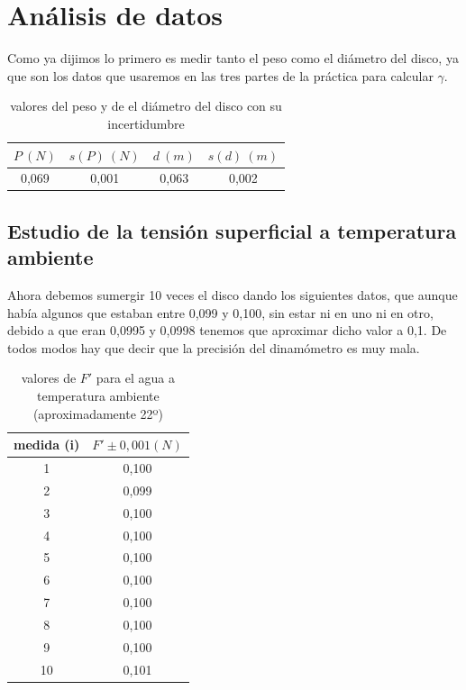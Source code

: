 \documentclass[12pt,a4paper]{book}
\begin{document}
\section{Análisis de datos}
Como ya dijimos lo primero es medir tanto el peso como el diámetro del disco, ya que son los datos que usaremos en las tres partes de la práctica para calcular $\gamma$.

\begin{table}[h!] %
\begin{center}
\begin{tabular}{|c|c|c|c|} \hline
$P  \ (N)$ & $s(P) \ (N)$ & $d \ (m)$ & $s(d) \ (m)$
 \\ \hline
0,069  & 0,001 & 0,063  & 0,002
 \\  \hline
\end{tabular}
\caption{valores del peso y de el diámetro del disco con su incertidumbre}
\label{tab:masa y peso}
\end{center}
\end{table}

\subsection{Estudio de la tensión superficial a temperatura ambiente}

Ahora debemos sumergir 10 veces el disco dando los siguientes datos, que aunque había algunos que estaban entre 0,099 y 0,100, sin estar ni en uno ni en otro, debido a que eran 0,0995 y 0,0998 tenemos que aproximar dicho valor a 0,1. De todos modos hay que decir que la precisión del dinamómetro es muy mala. \\


\begin{table}[h] %
\begin{center}
\begin{tabular}{|c|c|}
\hline

medida (i) & 	 $F' \pm 0,001 (N) $ \\ \hline
1 & 	 0,100 \\
2 & 	 0,099 \\
3 & 	 0,100 \\
4 & 	 0,100 \\
5 & 	 0,100 \\
6 & 	 0,100 \\
7 & 	 0,100 \\
8 & 	 0,100\\
9 & 	 0,100 \\
10 & 	 0,101 \\  \hline
\end{tabular}
\caption{valores de $F'$ para el agua a temperatura ambiente (aproximadamente 22º)}
\label{tab:tensión-F'}
\end{center}
\end{table}
\end{document}
